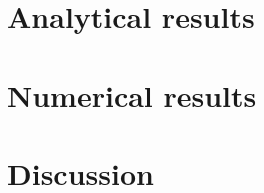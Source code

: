 
\section{Analytical results}

\section{Numerical results}

\section{Discussion}
\label{sec:discussion}

